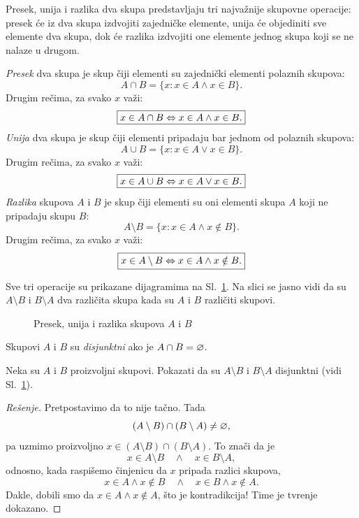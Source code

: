 Presek, unija i razlika dva skupa predstavljaju tri najva\v znije skupovne operacije:
presek \'ce iz dva skupa izdvojiti zajedni\v cke elemente, unija \'ce objediniti sve elemente dva skupa, dok \'ce
razlika izdvojiti one elemente jednog skupa koji se ne nalaze u drugom.

\begin{DEF}
  \emph{Presek} dva skupa je skup \v ciji elementi
  su zajedni\v cki elementi polaznih skupova:
  $$
    A \cap B = \{ x : x \in A \land x \in B \}.
  $$
  Drugim re\v cima, za svako $x$ va\v zi:
  $$
    \fbox{$x \in A \cap B \Leftrightarrow x \in A \land x \in B.$}
  $$
  \emph{Unija} dva skupa je skup \v ciji elementi pripadaju bar jednom od polaznih skupova:
  $$
    A \cup B = \{ x : x \in A \lor x \in B \}.
  $$
  Drugim re\v cima, za svako $x$ va\v zi:
  $$
    \fbox{$x \in A \cup B \Leftrightarrow x \in A \lor x \in B.$}
  $$
  \emph{Razlika} skupova $A$ i $B$ je skup \v ciji elementi su oni elementi skupa $A$ koji ne pripadaju skupu $B$:
  $$
    A \setminus B = \{ x : x \in A \land x \notin B \}.
  $$
  Drugim re\v cima, za svako $x$ va\v zi:
  $$
    \fbox{$x \in A \setminus B \Leftrightarrow x \in A \land x \notin B.$}
  $$
\end{DEF}

Sve tri operacije su prikazane dijagramima na Sl.~\ref{f06.sl.skupovne-op}. Na slici se jasno vidi
da su $A \setminus B$ i $B \setminus A$ dva razli\v cita skupa kada su $A$ i $B$ razli\v citi skupovi.

\begin{figure}
  \centering
  
  \caption{Presek, unija i razlika skupova $A$ i $B$}
  \label{f06.sl.skupovne-op}
\end{figure}

\begin{DEF}
  Skupovi $A$ i $B$ su \emph{disjunktni} ako je $A \cap B = \varnothing$.
\end{DEF}

\begin{EX}
  Neka su $A$ i $B$ proizvoljni skupovi. Pokazati da su $A \setminus B$ i $B \setminus A$ disjunktni
  (vidi Sl.~\ref{f06.sl.skupovne-op}).
\end{EX}
\begin{proof}[Re\v senje]  
  Pretpostavimo da to nije ta\v cno. Tada
  $$
    (A \setminus B) \cap (B \setminus A) \ne \varnothing,
  $$
  pa uzmimo proizvoljno $x \in (A \setminus B) \cap (B \setminus A)$. To zna\v ci da je
  $$
    x \in A \setminus B \quad \land \quad x \in B \setminus A,
  $$
  odnosno, kada raspi\v semo \v cinjenicu da $x$ pripada razlici skupova,
  $$
    x \in A \land x \notin B \quad \land \quad x \in B \land x \notin A.
  $$
  Dakle, dobili smo da $x \in A \land x \notin A$, \v sto je kontradikcija! Time je tvr\dj enje dokazano.
\end{proof}

